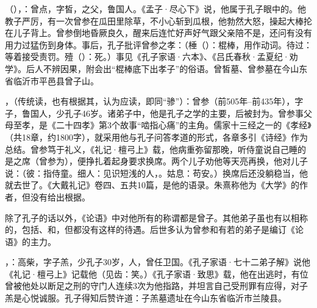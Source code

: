 （），：曾点，字皙，之父，鲁国人。《孟子·尽心下》说，他属于孔子眼中的。他教子严厉，有一次曾参在瓜田里除草，不小心斩到瓜根，他勃然大怒，操起大棒抡在儿子背上。曾参倒地昏厥良久，醒来后连忙好声好气跟父亲陪不是，还问有没有用力过猛伤到身体。事后，孔子批评曾参之孝：（棰（）：棍棒，用作动词。待过：等着接受责罚。殪（）：死。）事见《孔子家语·六本》、《吕氏春秋·孟夏纪·劝学》。后人不辨因果，附会出“棍棒底下出孝子”的俗语。曾皙墓、曾参墓在今山东省临沂市平邑县曾子山。

，（传统读，也有根据其，认为应读，即同“骖”）：曾参（前505年--前435年），字子，鲁国人，少孔子46岁。诸弟子中，他是孔子之学的主要，后被封为。曾参事父母至孝，是《二十四孝》第3个故事“啮指心痛”的主角。儒家十三经之一的《孝经》（共18章，约1800字），就采用他与孔子问答孝道的形式，各章多引《诗经》作为总结。曾参笃于礼义，《礼记·檀弓上》载，他病重弥留那晚，听侍童说自己睡的是之席（曾参为），便挣扎着起身要求换席。两个儿子劝他等天亮再换，他对儿子说：（彼：指侍童。细人：见识短浅的人，。姑息：苟安。）换席后还没躺稳当，他就去世了。《大戴礼记》卷四、五共10篇，是他的语录。朱熹称他为《大学》的作者，但没有给出根据。

除了孔子的话以外，《论语》中对他所有的称谓都是曾子。其他弟子虽也有以相称的，包括、和，但都没有这样的待遇。后世多认为曾参和有若的弟子是编订《论语》的主力。%

，：高柴，字子羔，少孔子30岁，人，曾任卫国。《孔子家语·七十二弟子解》说他《礼记·檀弓上》记载他（见齿：笑。）《孔子家语·致思》载，他在出逃时，有位曾被他处以断足之刑的守门人连续3次为他指路，并坦言自己受刑罪有应得，对子羔是心悦诚服。孔子得知后赞许道：子羔墓遗址在今山东省临沂市兰陵县。

